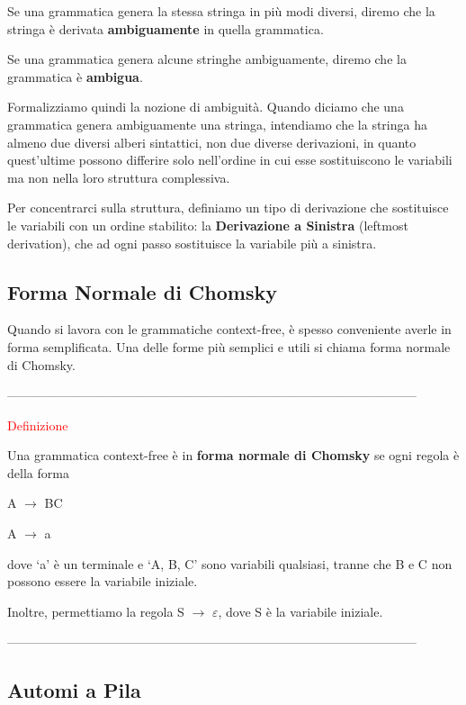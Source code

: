 \documentclass{article}
\begin{document}
Se una grammatica genera la stessa stringa in più modi diversi, diremo che la
stringa è derivata \textbf{ambiguamente} in quella grammatica. 

Se una grammatica genera alcune stringhe ambiguamente, diremo che la grammatica
è \textbf{ambigua}.

Formalizziamo quindi la nozione di ambiguità. Quando diciamo che una grammatica
genera ambiguamente una stringa, intendiamo che la stringa ha almeno due diversi
alberi sintattici, non due diverse derivazioni, in quanto quest'ultime possono
differire solo nell'ordine in cui esse sostituiscono le variabili ma non nella
loro struttura complessiva.

Per concentrarci sulla struttura, definiamo un tipo di derivazione che
sostituisce le variabili con un ordine stabilito: la \textbf{Derivazione a
Sinistra} (leftmost derivation), che ad ogni passo sostituisce la variabile più
a sinistra.

\subsection{Forma Normale di Chomsky}

Quando si lavora con le grammatiche context-free, è spesso conveniente averle in
forma semplificata. Una delle forme più semplici e utili si chiama forma normale
di Chomsky.

--------------------------------------------------------------------------------------------------

\begin{center}
    \textcolor{red}{Definizione}
\end{center}

Una grammatica context-free è in \textbf{forma normale di Chomsky} se ogni
regola è della forma

\begin{center}
    A $\rightarrow$ BC

    A $\rightarrow$ a
\end{center}

dove `a' è un terminale e `A, B, C' sono variabili qualsiasi, tranne che B e C
non possono essere la variabile iniziale.

Inoltre, permettiamo la regola S $\rightarrow$ $\varepsilon$, dove S è la
variabile iniziale.

--------------------------------------------------------------------------------------------------

\subsection{Automi a Pila}
\end{document}
